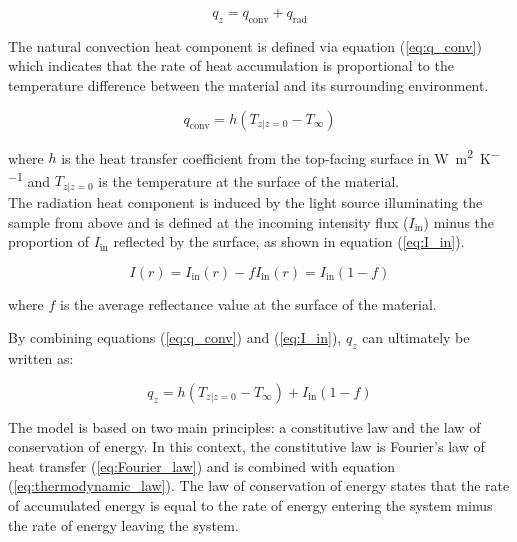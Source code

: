 \begin{equation}
q_z = q_{\mathrm{conv}} + q_{\mathrm{rad}}
\label{eq:q_z}
\end{equation}


The natural convection heat component is defined via equation (\ref{eq:q_conv}) which indicates that the rate of heat accumulation is proportional to the temperature difference between the material and its surrounding environment.

\begin{equation}
q_{\mathrm{conv}} = h(T_{z|z=0} - T_\infty)
\label{eq:q_conv}
\end{equation}

where $h$ is the heat transfer coefficient from the top-facing surface in \unit{\watt\per\square\metre\per\kelvin} and $T_{z|z=0}$ is the temperature at the surface of the material. \\

The radiation heat component is induced by the light source illuminating the sample from above and is defined at the incoming intensity flux ($I_{\mathrm{in}}$) minus the proportion of $I_{\mathrm{in}}$ reflected by the surface, as shown in equation (\ref{eq:I_in}). 

\begin{equation}
I(r) = I_{\mathrm{in}}(r) - f I_{\mathrm{in}}(r) = I_{\mathrm{in}} (1-f)
\label{eq:I_in}
\end{equation}

where $f$ is the average reflectance value at the surface of the material.

By combining equations (\ref{eq:q_conv}) and (\ref{eq:I_in}), $q_z$ can ultimately be written as:

\begin{equation}
q_z = h(T_{z|z=0} - T_\infty) + I_{\mathrm{in}} (1-f)
\end{equation}
                          

The model is based on two main principles: a constitutive law and the law of conservation of energy. In this context, the constitutive law is Fourier's law of heat transfer (\ref{eq:Fourier_law}) and is combined with equation (\ref{eq:thermodynamic_law}). The law of conservation of energy states that the rate of accumulated energy is equal to the rate of energy entering the system minus the rate of energy leaving the system. 

